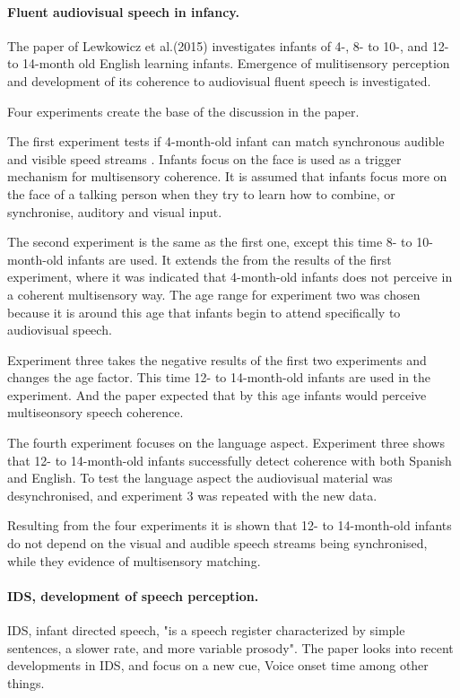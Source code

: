 \documentclass[12pt, a4paper]{article}
\begin{document}
\paragraph{Fluent audiovisual speech in infancy.}
The paper of Lewkowicz et al.(2015) investigates infants of 4-, 8- to 10-, and
12- to 14-month old English learning infants. Emergence of mulitisensory
perception and development of its coherence to audiovisual fluent speech is 
investigated.\cite{fluentAVspeech}

Four experiments create the base of the discussion in the paper.

The first experiment tests if 4-month-old infant can match synchronous audible
and visible speed streams \cite{fluentAVspeech}. Infants focus on the face is
used as a trigger mechanism for multisensory coherence. It is assumed that
infants focus more on the face of a talking person when they try to learn how to combine, or
synchronise, auditory and visual input.  

The second experiment is the same as the first one, except this time 8- to
10-month-old infants are used. It extends the from the results of the first
experiment, where it was indicated that 4-month-old infants does not perceive
in a coherent multisensory way. The age range for experiment two was chosen
because it is around this age that infants begin to attend specifically to
audiovisual speech.  

Experiment three takes the negative results of the first two experiments and
changes the age factor. This time 12- to 14-month-old infants are used in the
experiment. And the paper expected that by this age infants would perceive
multiseonsory speech coherence. \cite{fluentAVspeech} 

The fourth experiment focuses on the language aspect. Experiment three shows that
12- to 14-month-old infants successfully detect coherence with both Spanish and
English. To test the language aspect the audiovisual material was
desynchronised, and experiment 3 was repeated with the new data. 

Resulting from the four experiments it is shown that 12- to 14-month-old
infants do not depend on the visual and audible speech streams being
synchronised, while they evidence of multisensory matching.   

\paragraph{IDS, development of speech perception.}
IDS, infant directed speech, "is a speech register characterized by simple
sentences, a slower rate, and more variable prosody"\cite{idsdev}. The paper
looks into recent developments in IDS, and focus on a new cue, Voice onset time
among other things. 
\end{document}
